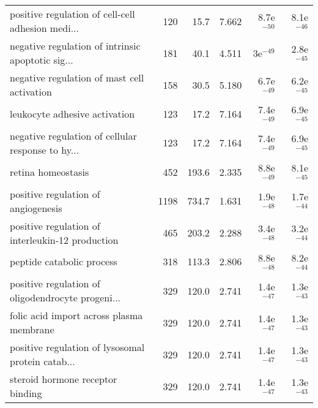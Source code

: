 \begin{longtable}{lrrrrr}
 positive regulation of cell-cell adhesion medi... &                     120 &                    15.7 &      7.662 &         8.7e$^{-50}$ &         8.1e$^{-46}$ \\
 negative regulation of intrinsic apoptotic sig... &                     181 &                    40.1 &      4.511 &           3e$^{-49}$ &         2.8e$^{-45}$ \\
       negative regulation of mast cell activation &                     158 &                    30.5 &      5.180 &         6.7e$^{-49}$ &         6.2e$^{-45}$ \\
                     leukocyte adhesive activation &                     123 &                    17.2 &      7.164 &         7.4e$^{-49}$ &         6.9e$^{-45}$ \\
 negative regulation of cellular response to hy... &                     123 &                    17.2 &      7.164 &         7.4e$^{-49}$ &         6.9e$^{-45}$ \\
                                retina homeostasis &                     452 &                   193.6 &      2.335 &         8.8e$^{-49}$ &         8.1e$^{-45}$ \\
               positive regulation of angiogenesis &                    1198 &                   734.7 &      1.631 &         1.9e$^{-48}$ &         1.7e$^{-44}$ \\
  positive regulation of interleukin-12 production &                     465 &                   203.2 &      2.288 &         3.4e$^{-48}$ &         3.2e$^{-44}$ \\
                         peptide catabolic process &                     318 &                   113.3 &      2.806 &         8.8e$^{-48}$ &         8.2e$^{-44}$ \\
 positive regulation of oligodendrocyte progeni... &                     329 &                   120.0 &      2.741 &         1.4e$^{-47}$ &         1.3e$^{-43}$ \\
          folic acid import across plasma membrane &                     329 &                   120.0 &      2.741 &         1.4e$^{-47}$ &         1.3e$^{-43}$ \\
 positive regulation of lysosomal protein catab... &                     329 &                   120.0 &      2.741 &         1.4e$^{-47}$ &         1.3e$^{-43}$ \\
                  steroid hormone receptor binding &                     329 &                   120.0 &      2.741 &         1.4e$^{-47}$ &         1.3e$^{-43}$ \\

\end{longtable}
